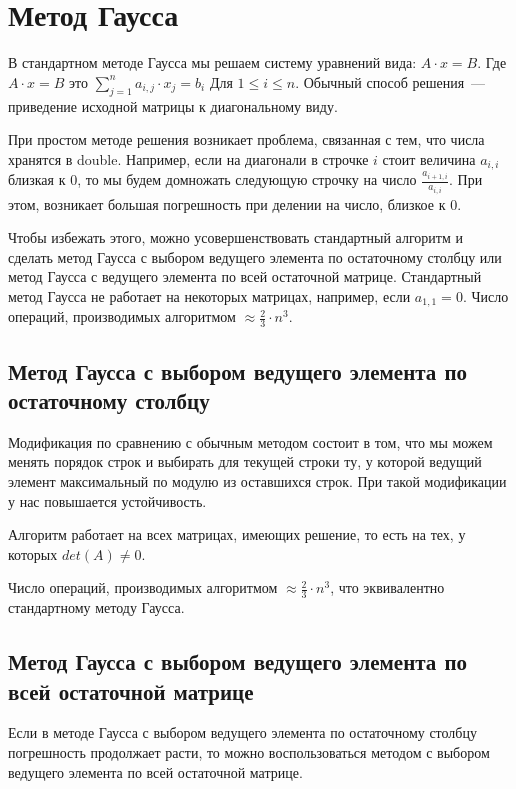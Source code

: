 \documentclass[../../report.tex]{subfiles}
\begin{document}


\chapter{Метод Гаусса}

В стандартном методе Гаусса мы решаем систему уравнений вида: $A \cdot x = B$.
Где $A \cdot x = B$ это
$\sum \limits_{j = 1}^{n} a_{i,j} \cdot x_j = b_i$ Для $1 \le i \le n$.
Обычный способ решения~--- приведение исходной матрицы к диагональному виду.

При простом методе решения возникает проблема, связанная с тем, что числа хранятся в double. Например, если на диагонали в строчке $i$ стоит величина $a_{i,i}$ близкая к $0$, то мы будем домножать следующую строчку на число $\frac{a_{i+1,i}}{a_{i,i}}$. При этом, возникает большая погрешность при делении на число, близкое к $0$.

Чтобы избежать этого, можно усовершенствовать стандартный алгоритм и сделать метод Гаусса с выбором ведущего элемента по остаточному столбцу или метод Гаусса с ведущего элемента по всей остаточной матрице.
Стандартный метод Гаусса не работает на некоторых матрицах, например, если $a_{1,1} = 0$.
Число операций, производимых алгоритмом $\approx \frac{2}{3} \cdot n^3$.

\section{Метод Гаусса с выбором ведущего элемента по остаточному столбцу}
Модификация по сравнению с обычным методом состоит в том, что мы можем менять порядок строк и выбирать для текущей строки ту, у которой ведущий элемент максимальный по модулю из оставшихся строк.
При такой модификации у нас повышается устойчивость.

Алгоритм работает на всех матрицах, имеющих решение, то есть на тех, у которых $det(A) \neq 0$.

Число операций, производимых алгоритмом $\approx \frac{2}{3} \cdot n^3$, что эквивалентно стандартному методу Гаусса.

\section{Метод Гаусса с выбором ведущего элемента по всей остаточной матрице}
Если в методе Гаусса с выбором ведущего элемента по остаточному столбцу погрешность продолжает расти, то можно воспользоваться методом с выбором ведущего элемента по всей остаточной матрице.
\end{document}
